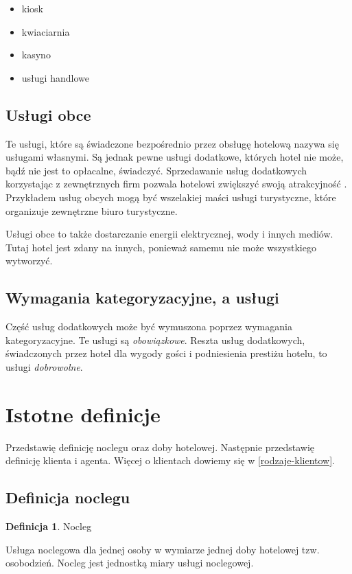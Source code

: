 \documentclass[a4paper,onecolumn,oneside,11pt,wide,floatssmall]{mwrep}
\theoremstyle{definition}
\newtheorem{defn}{Definicja}[section]
\theoremstyle{plain}%
\theoremstyle{remark}
\begin{document}
\begin{itemize}
  \item kiosk
  \item kwiaciarnia
  \item kasyno
  \item usługi handlowe
\end{itemize}

\subsection{Usługi obce}
Te usługi, które są świadczone bezpośrednio przez obsługę hotelową nazywa 
się usługami własnymi. Są jednak pewne usługi dodatkowe, których hotel nie 
może, bądź nie jest to opłacalne, świadczyć. Sprzedawanie usług dodatkowych 
korzystając z zewnętrznych firm pozwala hotelowi zwiększyć swoją atrakcyjność
. Przykładem usług obcych mogą być wszelakiej maści usługi turystyczne, 
które organizuje zewnętrzne biuro turystyczne.

Usługi obce to także dostarczanie energii elektrycznej, wody i innych mediów.
 Tutaj hotel jest zdany na innych, ponieważ samemu nie może wszystkiego 
wytworzyć.

\subsection{Wymagania kategoryzacyjne, a usługi}
Część usług dodatkowych może być wymuszona poprzez wymagania kategoryzacyjne.
 Te usługi są \emph{obowiązkowe}. Reszta usług dodatkowych, świadczonych 
 przez hotel dla wygody gości i podniesienia prestiżu 
 hotelu, to usługi \emph{dobrowolne}.

\section{Istotne definicje}
Przedstawię definicję noclegu oraz doby hotelowej. Następnie przedstawię 
definicję klienta i agenta. Więcej o klientach dowiemy się w \ref{rodzaje-klientow}.

\subsection{Definicja noclegu}

\begin{defn}{Nocleg}

Usługa noclegowa dla jednej osoby w wymiarze jednej doby hotelowej tzw. 
osobodzień. Nocleg jest jednostką miary usługi noclegowej.

\end{defn} 
\end{document}
